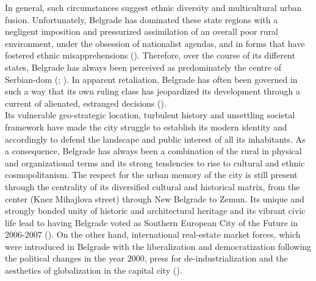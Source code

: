 \documentclass[11pt]{report}
\begin{document}
{{{{In general, such circumstances suggest ethnic diversity and multicultural urban fusion. Unfortunately, Belgrade  has dominated these state  regions with a negligent imposition and pressurized assimilation of an overall poor rural environment, under the obsession of nationalist agendas, and in forms that have fostered ethnic misapprehensions (\href{Samardzic}{\citealt{doytchinov_belgrade_2015}}).
Therefore, over the course of its different states, Belgrade has always been perceived as predominately the centre of Serbian-dom (\href{Savic}{\citealt{savic_where_2014}}; \href{Heppner}{\citealt{doytchinov_capital_2015}}).
In apparent retaliation, Belgrade has often been  governed in such a way that its own ruling class has jeopardized its development through a current of alienated, estranged decisions (\href{Doytchinov}{\citealt{doytchinov_belgrade_2015}}).
\\

Its vulnerable geo-strategic location, turbulent history and unsettling societal framework have made the city struggle to establish its modern identity and accordingly to defend the landscape and public interest of all its inhabitants. As a consequence, Belgrade has always been a combination of the rural in physical and organizational terms and its strong tendencies to rise to cultural and ethnic cosmopolitanism. The respect for the urban memory of the city is still present through the centrality of its diversified cultural and historical matrix, from the center (Knez Mihajlova street) through New Belgrade to Zemun. Its unique and strongly bonded unity of historic and architectural heritage and its vibrant civic life lead to having Belgrade voted as Southern European City of the Future in 2006-2007  (\href{Hirt}{\citealt{hirt_belgrade_2009}}).
On the other hand, international real-estate market forces, which were introduced in Belgrade with the liberalization and democratization following the political changes in the year 2000, press for de-industrialization and the aesthetics of globalization in the capital city  (\href{Grozdanic}{\citealt{grozdanic_belgrade_2008}}).
\\

}}}}
\end{document}
